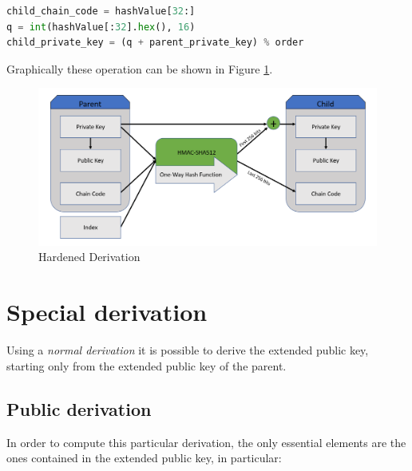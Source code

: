 \begin{lstlisting}[language=Python]
child_chain_code = hashValue[32:]
q = int(hashValue[:32].hex(), 16)
child_private_key = (q + parent_private_key) % order
\end{lstlisting}


\begin{flushleft}
	Graphically these operation can be shown in Figure \ref{fig:hardened_derivation}.
\end{flushleft}

\begin{figure}[ht!]
	\centering
	\includegraphics[width=14.5cm]{Figures/hardened_derivation_v2.png}
	\caption{Hardened Derivation }
	\label{fig:hardened_derivation}
\end{figure}


\section{Special derivation}
Using a \textit{normal derivation} it is possible to derive the extended public key, starting only from the extended public key of the parent.

\subsection{Public derivation}

In order to compute this particular derivation, the only essential elements are the ones contained in the extended public key, in particular:

